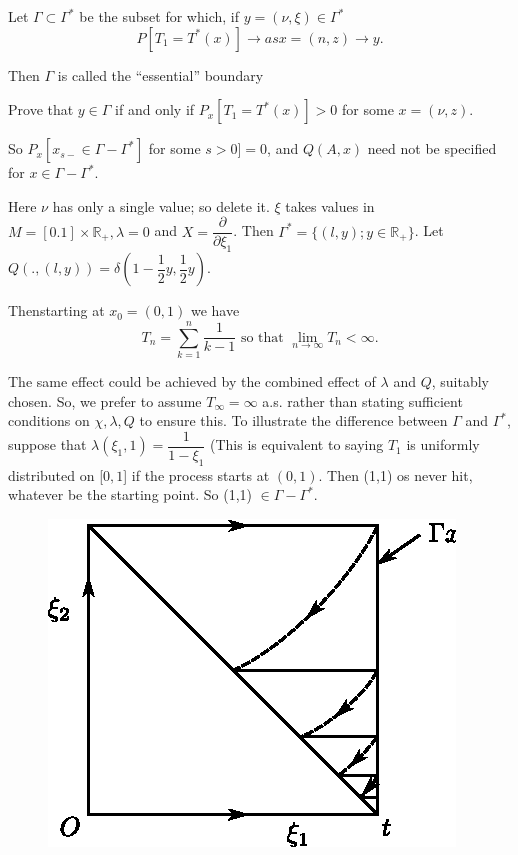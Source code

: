Let $\Gamma \subset \Gamma^*$ be the subset for which, if $y = (\nu,
\xi )\in \Gamma^*$ 
$$
P[T_1 = T^* (x)] \to as x= (n,z) \to y.
$$
 
Then $\Gamma$ is called the ``essential'' boundary 

\begin{exercise} %
  Prove that $y \in \Gamma$ if and only if $P_x [T_1 = T^* (x) ]> 0$
  for some $ x = (\nu, z)$.  
\end{exercise}

So $P_x [x_{s-}\in \Gamma - \Gamma^*]$ for some $s > 0] = 0$, and $Q(A,
  x)$ need not be specified for $x \in \Gamma - \Gamma^*$.  

\begin{example} %
  Here $\nu$ has only a single value; so delete it. $\xi$ takes values
  in $M = [0.1] \times \mathbb{R}_+, \lambda = 0 $ and $X =
  \dfrac{\partial}{\partial \xi _1}$. Then $\Gamma^* = \{ (l, y); y
  \in \mathbb{R}_+\}$. Let $Q(., (l, y))= \delta (1- \dfrac{1}{2}y,
  \dfrac{1}{2}y)$.  

  Then\pageoriginale starting at $x_0 = (0,1)$ we have 
  $$
  T_n = \sum^n_{k=1}\frac{1}{k-1}\text{ so that }\lim_{ n \to \infty
  }T_n < \infty. 
 $$

  The same effect could be achieved by the combined effect of $\lambda$
  and $Q$, suitably chosen. So, we prefer to assume $T_\infty= \infty$
  a.s. rather than stating sufficient conditions on $\chi, \lambda, Q$
  to ensure this. To illustrate the difference between
  $\Gamma$ and $\Gamma^*$, suppose that $\lambda(\xi_1, 1)=
  \dfrac{1}{1-\xi _1}$ (This is equivalent to saying $T_1$ is
  uniformly distributed on [$0,1$] if the process starts at
  $(0,1)$. Then (1,1) os never hit, whatever be the starting
  point. So (1,1) $\in \Gamma - \Gamma^*$.  

\begin{figure}[H]
\centering
\includegraphics{vol75-figures/fig2.2.eps}
\caption{}
\end{figure}
\end{example}

